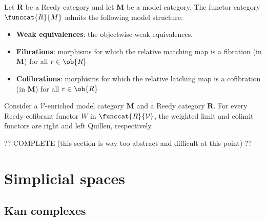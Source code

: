    \begin{property}
        Let $\mathbf{R}$ be a Reedy category and let $\mathbf{M}$ be a model category. The functor category $\funccat{R}{M}$ admits the following model structure:
        \begin{itemize}
            \item\textbf{Weak equivalences}: the objectwise weak equivalences.
            \item\textbf{Fibrations}: morphisms for which the relative matching map is a fibration (in $\mathbf{M}$) for all $r\in\ob{R}$
            \item\textbf{Cofibrations}: morphisms for which the relative latching map is a cofibration (in $\mathbf{M}$) for all $r\in\ob{R}$
        \end{itemize}
    \end{property}

    \begin{property}
        Consider a $\mathcal{V}$-enriched model category $\mathbf{M}$ and a Reedy category $\mathbf{R}$. For every Reedy cofibrant functor $W$ in $\funccat{R}{\mathcal{V}}$, the weighted limit and colimit functors are right and left Quillen, respectively.
    \end{property}

    ?? COMPLETE (this section is way too abstract and difficult at this point) ??

\section{Simplicial spaces}
\subsection{Kan complexes}



